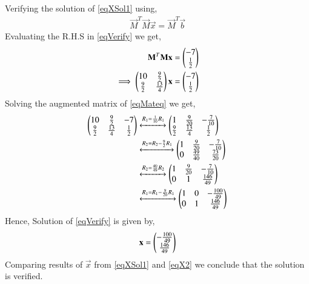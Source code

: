 \documentclass[journal,12pt,twocolumn]{IEEEtran}
\begin{document}
Verifying the solution of \eqref{eqXSol1} using,
\begin{align}
\vec{M}^T\vec{M}\vec{x} = \vec{M}^T\vec{b}\label{eqVerify}
\end{align}
Evaluating the R.H.S in \eqref{eqVerify} we get,
\begin{align}
\mathbf{M}^T\mathbf{M}\mathbf{x} &= \begin{pmatrix}-7\\\frac{1}{2}\end{pmatrix}\\
\implies\begin{pmatrix}10&\frac{9}{2}\\\frac{9}{2}&\frac{13}{4}\end{pmatrix}\mathbf{x} &= \begin{pmatrix}-7\\\frac{1}{2}\end{pmatrix}\label{eqMateq}
\end{align}
Solving the augmented matrix of \eqref{eqMateq} we get,
\begin{align}
\begin{pmatrix}10&\frac{9}{2}&-7\\\frac{9}{2}&\frac{13}{4}&\frac{1}{2}\end{pmatrix} &\xleftrightarrow{R_1=\frac{1}{10}R_1}\begin{pmatrix}1&\frac{9}{20}&-\frac{7}{10}\\\frac{9}{2}&\frac{13}{4}&\frac{1}{2}\end{pmatrix}\\
&\xleftrightarrow{R_2=R_2-\frac{9}{2}R_1}\begin{pmatrix}1&\frac{9}{20}&-\frac{7}{10}\\0&\frac{49}{40}&\frac{73}{20}\end{pmatrix}\\
&\xleftrightarrow{R_2=\frac{40}{49}R_2}\begin{pmatrix}1&\frac{9}{20}&-\frac{7}{10}\\0&1&\frac{146}{49}\end{pmatrix}\\
&\xleftrightarrow{R_1=R_1-\frac{9}{20}R_1}\begin{pmatrix}1&0&-\frac{100}{49}\\0&1&\frac{146}{49}\end{pmatrix}
\end{align}
Hence, Solution of \eqref{eqVerify} is given by,
\begin{align}
\mathbf{x}=\begin{pmatrix}-\frac{100}{49}\\\frac{146}{49}\end{pmatrix}\label{eqX2}
\end{align}
Comparing results of $\vec{x}$ from \eqref{eqXSol1} and \eqref{eqX2} we conclude that the solution is verified.
 
\end{document}
